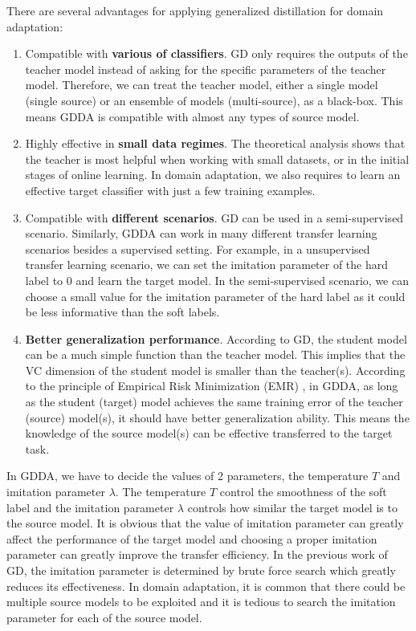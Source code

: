 \documentclass[11pt,onecolumn]{article}
\begin{document}
There are several advantages for applying generalized distillation for domain adaptation:
\begin{enumerate}
\item Compatible with \textbf{various of classifiers}. GD only requires the outputs of the teacher model instead of asking for the specific parameters of the teacher model. Therefore, we can treat the teacher model, either a single model (single source) or an ensemble of models (multi-source), as a black-box. This means GDDA is compatible with almost any types of source model.
\item Highly effective in \textbf{small data regimes}. The theoretical analysis shows that the teacher is most helpful when working with small datasets, or in the initial stages of online learning. In domain adaptation, we also requires to learn an effective target classifier with just a few training examples.
\item Compatible with \textbf{different scenarios}. GD can be used in a semi-supervised scenario. Similarly, GDDA can work in many different transfer learning scenarios besides a supervised setting. For example, in a unsupervised transfer learning scenario, we can set the imitation parameter of the hard label to 0 and learn the target model. In the semi-supervised scenario, we can choose a small value for the imitation parameter of the hard label as it could be less informative than the soft labels. 
\item \textbf{Better generalization performance}. According to GD, the student model can be a much simple function than the teacher model. This implies that the VC dimension of the student model is smaller than the teacher(s). According to the principle of Empirical Risk Minimization (EMR) \cite{vapnik1999overview}, in GDDA, as long as the student (target) model achieves the same training error of the teacher (source) model(s), it should have better generalization ability. This means the knowledge of the source model(s) can be effective transferred to the target task.
\end{enumerate}

In GDDA, we have to decide the values of 2 parameters, the temperature $T$ and imitation parameter $\lambda$. The temperature $T$ control the smoothness of the soft label and the imitation parameter $\lambda$ controls how similar the target model is to the source model. It is obvious that the value of imitation parameter can greatly affect the performance of the target model and choosing a proper imitation parameter can greatly improve the transfer efficiency. In the previous work of GD, the imitation parameter is determined by brute force search which greatly reduces its effectiveness. In domain adaptation, it is common that there could be multiple source models to be exploited and it is tedious to search the imitation parameter for each of the source model.
\end{document}
